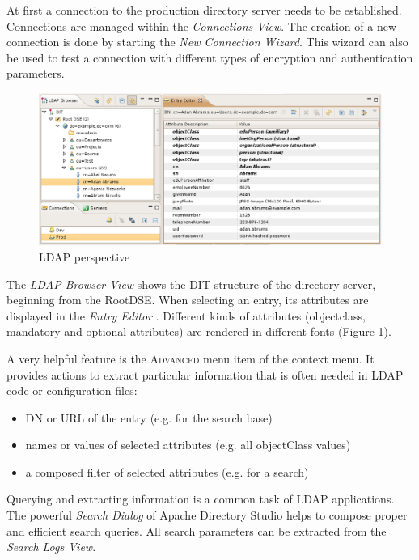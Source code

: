 \documentclass[a4paper,11pt,oneside]{article}
\begin{document}
At first a connection to the production directory server needs to be established. Connections are managed within the \textit{Connections View}. The creation of a new connection is done by starting the \textit{New Connection Wizard}. This wizard can also be used to test a connection with different types of encryption and authentication parameters.

\begin{figure}[htb]
  \begin{center}
  \includegraphics[width=14cm]{images/01_ldap_perspecitve.eps}
  \end{center}
  \caption{LDAP perspective}
  \label{LDAP perspective}
\end{figure}

The \textit{LDAP Browser View} shows the DIT structure of the directory server, beginning from the RootDSE. When selecting an entry, its attributes are displayed in the \textit{Entry Editor} . Different kinds of attributes (objectclass, mandatory and optional attributes) are rendered in different fonts (Figure \ref{LDAP perspective}).

A very helpful feature is the \textsc{Advanced} menu item of the context menu. It provides actions to extract particular information that is often needed in LDAP code or configuration files:
\begin{itemize}
\item DN or URL of the entry (e.g. for the search base)
\item names or values of selected attributes (e.g. all objectClass values)
\item a composed filter of selected attributes (e.g. for a search)
\end{itemize}

Querying and extracting information is a common task of LDAP applications. The powerful \textit{Search Dialog} of Apache Directory Studio helps to compose proper and efficient search queries. All search parameters can be extracted from the \textit{Search Logs View}.
\end{document}
